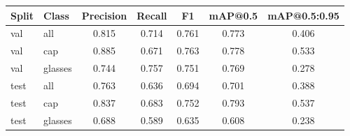 \begin{tabular}{llccccc}
\toprule
Split & Class & Precision & Recall & F1 & mAP@0.5 & mAP@0.5:0.95 \\
\midrule
val & all & 0.815 & 0.714 & 0.761 & 0.773 & 0.406 \\
val & cap & 0.885 & 0.671 & 0.763 & 0.778 & 0.533 \\
val & glasses & 0.744 & 0.757 & 0.751 & 0.769 & 0.278 \\
test & all & 0.763 & 0.636 & 0.694 & 0.701 & 0.388 \\
test & cap & 0.837 & 0.683 & 0.752 & 0.793 & 0.537 \\
test & glasses & 0.688 & 0.589 & 0.635 & 0.608 & 0.238 \\
\bottomrule
\end{tabular}

